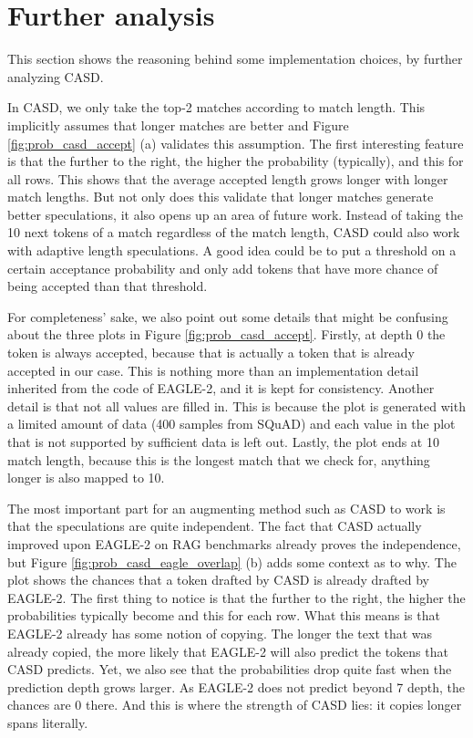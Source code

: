\section{Further analysis}
\label{sec:further_analysis}
This section shows the reasoning behind some implementation choices, by further analyzing CASD.

In CASD, we only take the top-2 matches according to match length. This implicitly assumes that longer matches are better and Figure \ref{fig:prob_casd_accept} (a) validates this assumption. The first interesting feature is that the further to the right, the higher the probability (typically), and this for all rows. This shows that the average accepted length grows longer with longer match lengths. But not only does this validate that longer matches generate better speculations, it also opens up an area of future work. Instead of taking the 10 next tokens of a match regardless of the match length, CASD could also work with adaptive length speculations. A good idea could be to put a threshold on a certain acceptance probability and only add tokens that have more chance of being accepted than that threshold. 

For completeness' sake, we also point out some details that might be confusing about the three plots in Figure \ref{fig:prob_casd_accept}. Firstly, at depth 0 the token is always accepted, because that is actually a token that is already accepted in our case. This is nothing more than an implementation detail inherited from the code of EAGLE-2, and it is kept for consistency. Another detail is that not all values are filled in. This is because the plot is generated with a limited amount of data (400 samples from SQuAD) and each value in the plot that is not supported by sufficient data is left out. Lastly, the plot ends at 10 match length, because this is the longest match that we check for, anything longer is also mapped to 10. 

The most important part for an augmenting method such as CASD to work is that the speculations are quite independent. The fact that CASD actually improved upon EAGLE-2 on RAG benchmarks already proves the independence, but Figure \ref{fig:prob_casd_eagle_overlap} (b) adds some context as to why. The plot shows the chances that a token drafted by CASD is already drafted by EAGLE-2. The first thing to notice is that the further to the right, the higher the probabilities typically become and this for each row. What this means is that EAGLE-2 already has some notion of copying. The longer the text that was already copied, the more likely that EAGLE-2 will also predict the tokens that CASD predicts. Yet, we also see that the probabilities drop quite fast when the prediction depth grows larger. As EAGLE-2 does not predict beyond 7 depth, the chances are 0 there. And this is where the strength of CASD lies: it copies longer spans literally.


